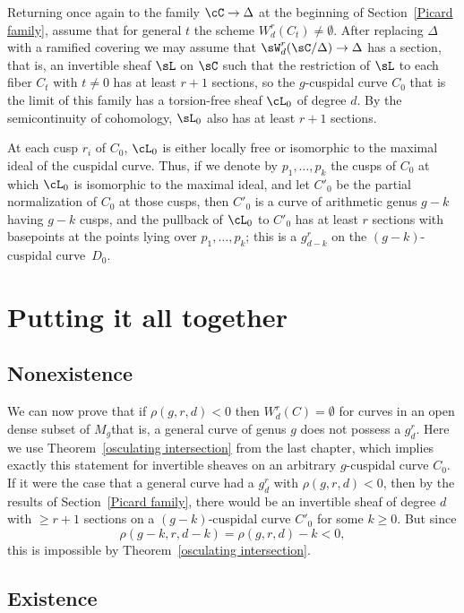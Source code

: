 Returning once again to the family $\cC \to \Delta$ at the beginning
of Section~\ref{Picard family}, assume that for general $t$ the scheme
$W^{r}_{d}(C_t)\neq \emptyset$. After replacing $\Delta$ with a
ramified covering we may assume that
$\sW^{r}_{d}(\sC/\Delta) \to \Delta$ has a section, that is, an
invertible sheaf $\sL$ on $\sC$ such that the restriction of $\sL$ to
each fiber $C_{t}$ with $t\neq 0$ has at least $r+1$ sections, so the
$g$-cuspidal curve $C_0$ that is the limit of this family has a
torsion-free sheaf $\cL_0$ of degree $d$. By the semicontinuity of
%
cohomology, $\sL_{0}$ also has at least $r+1$ sections.

At each cusp $r_i$ of $C_0$, $\cL_0$ is either locally free or
isomorphic to the maximal ideal of the cuspidal curve. Thus, if we
denote by $p_1,\dots, p_k$ the cusps of $C_0$ at which $\cL_0$ is
isomorphic to the maximal ideal, and let $C'_{0}$ be the partial
normalization of $C_0$ at those cusps, then $C'_{0}$ is a curve of
arithmetic genus $g-k$ having $g-k$ cusps, and the pullback of $\cL_0$
to $C'_{0}$ has at least $r$ sections with basepoints at the points
lying over $p_1,\dots,p_k$;  this is a $g^r_{d-k}$ on the
$(g-k)$-cuspidal curve~$D_0$.

\section{Putting it all together}
\label{nonexistence}

\subsection*{Nonexistence}

We can now prove that if $\rho(g,r,d) < 0$  then $W^{r}_{d}(C) =
\emptyset$ for curves in an open dense subset of $M_{g}$\emdash that is,
a general curve of genus $g$ does not possess a $g^r_d$.
Here we use Theorem~\ref{osculating intersection} from the last chapter,
which implies exactly this statement for invertible sheaves on an
arbitrary $g$-cuspidal curve $C_0$. If it were the case that a general
curve 
had
a $g^r_d$ with $\rho(g,r,d) < 0$, then by the results
of Section~\ref{Picard family}, there would be
 an invertible sheaf of degree $d$ with $\geq r+1$ sections on a
 $(g-k)$-cuspidal curve  $ C'_0$ for some $k \geq 0$. But since
$$
\rho(g-k, r, d-k) = \rho(g,r,d) - k < 0
,
$$
this is impossible by Theorem~\ref{osculating intersection}.

\subsection*{Existence}

